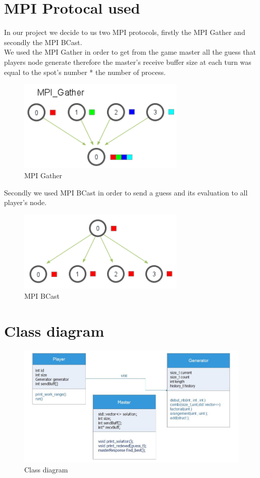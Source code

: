 \section{MPI Protocal used}
In our project we decide to us two MPI protocols, firstly the MPI Gather and secondly the MPI BCast. \\
We used the MPI Gather in order to get from the game master all the guess that players node generate therefore the master's receive buffer size at each turn  was equal to the spot's number * the number of process. 
        \begin{figure}[H]
	    \centering
	    \includegraphics[width=8cm] {gather.png}
	    \caption{MPI Gather }
	    \label{plot12}
	\end{figure}

Secondly we used MPI BCast in order to send a guess and its evaluation to all player's node.

        \begin{figure}[H]
	    \centering
	    \includegraphics[width=8cm] {bcast2.png}
	    \caption{MPI BCast  }
	    \label{plot12}
	\end{figure}

\section{Class diagram}	

\begin{figure}[H]
	\centering
	\includegraphics[width=15cm] {classDiag.JPG}
	\caption{Class diagram  }
	\label{plot12}
\end{figure}
